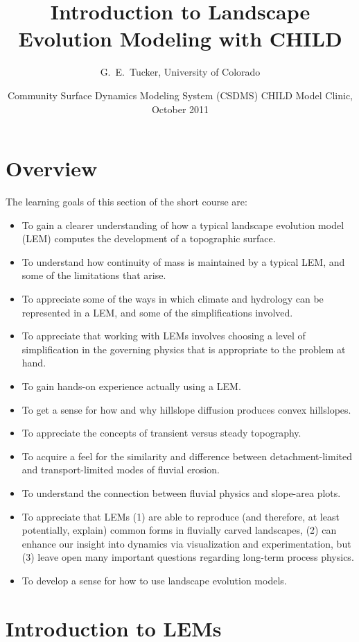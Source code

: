 \documentclass[12pt]{amsart}
\title{Introduction to Landscape Evolution Modeling with CHILD}
\author{G.\ E.\ Tucker, University of Colorado}
\date{Community Surface Dynamics Modeling System (CSDMS) CHILD Model Clinic, October 2011} %
\begin{document}
\maketitle
\tableofcontents

\section{Overview}

The learning goals of this section of the short course are:
\begin{itemize}
\item To gain a clearer understanding of how a typical landscape evolution model (LEM) computes the development of a topographic surface.
\item To understand how continuity of mass is maintained by a typical LEM, and some of the limitations that arise.
\item To appreciate some of the ways in which climate and hydrology can be represented in a LEM, and some of the simplifications involved.
\item To appreciate that working with LEMs involves choosing a level of simplification in the governing physics that is appropriate to the problem at hand.
\item To gain hands-on experience actually using a LEM.
\item To get a sense for how and why hillslope diffusion produces convex hillslopes.
\item To appreciate the concepts of transient versus steady topography.
\item To acquire a feel for the similarity and difference between detachment-limited and transport-limited modes of fluvial erosion.
\item To understand the connection between fluvial physics and slope-area plots.
\item To appreciate that LEMs (1) are able to reproduce (and therefore, at least potentially, explain) common forms in fluvially carved landscapes, (2) can enhance our insight into dynamics via visualization and experimentation, but (3) leave open many important questions regarding long-term process physics.
\item To develop a sense for how to use landscape evolution models.
\end{itemize}

\section{Introduction to LEMs}
\end{document}
